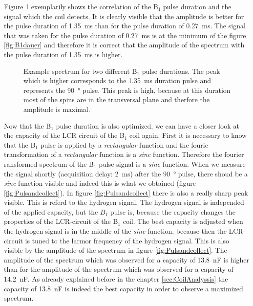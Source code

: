 Figure \ref{fig:pulsedurationbeispiel} exemplarily shows the correlation of the B$_1$ pulse duration and the signal which the coil detects. It is clearly visible that the amplitude is better for the pulse duration of \SI{1.35}{\milli \second} than for the pulse duration of \SI{0.27}{\milli \second}. The signal that was taken for the pulse duration of \SI{0.27}{\milli \second} is at the minimum of the figure \ref{fig:B1dauer} and therefore it is correct that the amplitude of the spectrum with the pulse duration of \SI{1.35}{\milli \second} is higher.
\begin{figure}[H]
    \centering
    
    \caption[Example spectrum for two different B$_1$ pulse durations.]{Example spectrum for two different B$_1$ pulse durations. The peak which is higher corresponds to the \SI{1.35}{\milli \second} duration pulse and represents the \SI{90}{\degree} pulse. This peak is high, because at this duration most of the spins are in the transversal plane and therfore the amplitude is maximal.}
    \label{fig:pulsedurationbeispiel}
\end{figure}
Now that the B$_1$ pulse duration is also optimized, we can have a closer look at the capacity of the LCR circuit of the B$_1$ coil again. First it is necessary to know that the B$_1$ pulse is applied by a \textit{rectangular} function and the fourie transformation of a \textit{rectangular} function is a \textit{sinc} function. Therefore the fourier ransformed spectrum of the B$_1$ pulse signal is a \textit{sinc} function. When we measure the signal shortly (acquisition delay: \SI{2}{\milli \second}) after the \SI{90}{\degree} pulse, there shoud be a \textit{sinc} function visible and indeed this is what we obtained (figure \ref{fig:Pulsandcollect}). In figure \ref{fig:Pulsandcollect} there is also a really sharp peak visible. This is referd to the hydrogen signal. The hydrogen signal is independed of the applied capacity, but the $B_1$ pulse is, because the capacity changes the properties of the LCR-circuit of the B$_1$ coil. The best capacity is adjusted when the hydrogen signal is in the middle of the \textit{sinc} function, because then the LCR-circuit is tuned to the larmor frequency of the hydrogen signal. This is also visible by the amplitude of the spectrum in figure \ref{fig:Pulsandcollect}. The amplitude of the spectrum which was observed for a capacity of \SI{13.8}{\nano \farad} is higher than for the amplitude of the spectrum which was observed for a capacity of \SI{14.2}{\nano \farad}. As already explained before in the chapter \ref{sec:CoilAnalyssis} the capacity of \SI{13.8}{\nano \farad} is indeed the best capacity in order to observe a maximized spectrum.
